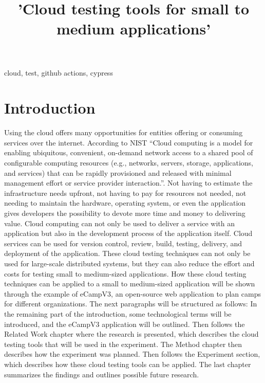 \documentclass[conference]{IEEEtran}
\begin{document}
\title{'Cloud testing tools for small to medium applications'}

\author{
}

\maketitle

\begin{abstract}
	
\end{abstract}

\begin{IEEEkeywords}
	cloud, test, github actions, cypress
\end{IEEEkeywords}

\section{Introduction}

Using the cloud offers many opportunities for entities offering or consuming services over the internet.
According to NIST \enquote{Cloud computing is a model for enabling ubiquitous, convenient, on-demand network access to a shared
	pool of configurable computing resources (e.g., networks, servers, storage, applications, and services) that
	can be rapidly provisioned and released with minimal management effort or service provider interaction.}\cite{mell2011nist}.
Not having to estimate the infrastructure needs upfront, not having to pay for resources not needed, not needing to maintain
the hardware, operating system, or even the application gives developers the possibility to devote more time and money
to delivering value.
Cloud computing can not only be used to deliver a service with an application but also in the development process of
the application itself.
Cloud services can be used for version control, review, build, testing, delivery, and deployment of the application.
These cloud testing techniques can not only be used for large-scale distributed systems, but they can also reduce the
effort and costs for testing small to medium-sized applications.
How these cloud testing techniques can be applied to a small to medium-sized application will be shown through the example
of eCampV3, an open-source web application to plan camps for different organizations.
The next paragraphs will be structured as follows:
In the remaining part of the introduction, some technological terms will be introduced, and the eCampV3 application will be
outlined.
Then follows the Related Work chapter where the research is presented, which describes the cloud testing tools that
will be used in the experiment.
The Method chapter then describes how the experiment was planned.
Then follows the Experiment section, which describes how these cloud testing tools can be applied.
The last chapter summarizes the findings and outlines possible future research.
\end{document}
